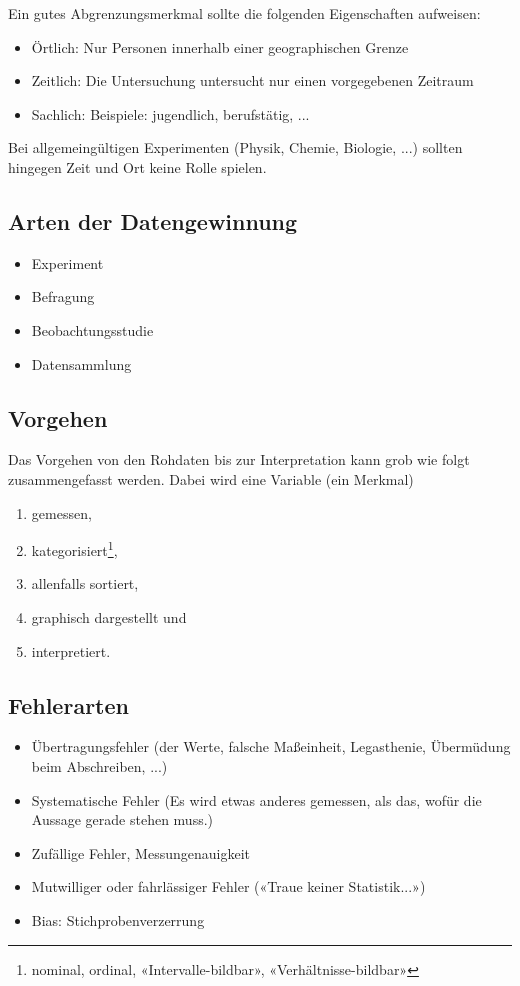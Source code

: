Ein gutes Abgrenzungsmerkmal sollte die folgenden Eigenschaften
aufweisen:
\begin{itemize}
\item Örtlich: Nur Personen innerhalb einer geographischen Grenze
\item Zeitlich: Die Untersuchung untersucht nur einen vorgegebenen
Zeitraum
\item Sachlich: Beispiele: jugendlich, berufstätig, ...
\end{itemize}

Bei allgemeingültigen Experimenten (Physik, Chemie, Biologie, ...)
sollten hingegen Zeit und Ort keine Rolle spielen.


\subsection{Arten der Datengewinnung}
\begin{itemize}
 \item Experiment
 \item Befragung
 \item Beobachtungsstudie
 \item Datensammlung
\end{itemize}

\subsection{Vorgehen}
Das Vorgehen von den Rohdaten bis zur Interpretation kann grob wie folgt zusammengefasst werden. Dabei wird eine Variable (ein Merkmal)
\begin{enumerate}
\item gemessen,
\item kategorisiert\footnote{nominal, ordinal, «Intervalle-bildbar»,
    «Verhältnisse-bildbar»},
\item allenfalls sortiert,
\item graphisch dargestellt und
\item interpretiert.
\end{enumerate}
\newpage


\subsection{Fehlerarten}
\begin{itemize}

\item Übertragungsfehler (der Werte, \zB falsche Maßeinheit,
  Legasthenie, Übermüdung beim Abschreiben, ...)

\item Systematische Fehler (Es wird etwas anderes gemessen, als das,
  wofür die Aussage gerade stehen muss.)

\item Zufällige Fehler, Messungenauigkeit

\item Mutwilliger oder fahrlässiger Fehler («Traue keiner Statistik...»)

\item Bias: Stichprobenverzerrung
\end{itemize}
\newpage

